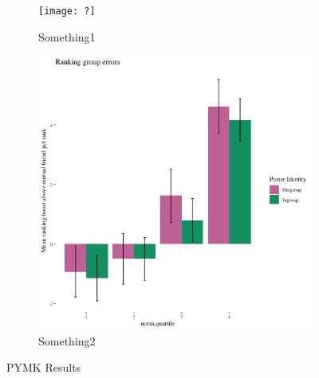 \documentclass[12pt,letterpaper]{article}
\begin{document}
\begin{figure}[ht]

    \begin{subfigure}{.5\textwidth} 
        \centering
        \texttt{[image: ?]} 
        \caption{Something1}
        \label{fig:sub-first}
        \end{subfigure}
    \begin{subfigure}{.5\textwidth}
        \centering
        \includegraphics[width=1\linewidth]{Output/Graphs/Audit/Misranking relative to expectation/Mutual friends expectation/US PYMK by norm pref.jpg}  
        \caption{Something2}
        \label{fig:sub-second}
    \end{subfigure}
\caption{PYMK Results}
\end{figure}

\end{document}

